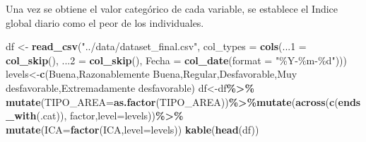 \documentclass[notspecified,article,submit,moreauthors,pdftex]{Definitions/mdpi}
\newenvironment{Shaded}{\begin{snugshade}}{\end{snugshade}}
\newcommand{\AttributeTok}[1]{\textcolor[rgb]{0.13,0.29,0.53}{#1}}
\newcommand{\FunctionTok}[1]{\textcolor[rgb]{0.13,0.29,0.53}{\textbf{#1}}}
\newcommand{\NormalTok}[1]{#1}
\newcommand{\OtherTok}[1]{\textcolor[rgb]{0.56,0.35,0.01}{#1}}
\newcommand{\SpecialCharTok}[1]{\textcolor[rgb]{0.81,0.36,0.00}{\textbf{#1}}}
\newcommand{\StringTok}[1]{\textcolor[rgb]{0.31,0.60,0.02}{#1}}
\begin{document}
Una vez se obtiene el valor categórico de cada variable, se establece el
Indice global diario como el peor de los individuales.

\begin{Shaded}
\begin{Highlighting}[]
\NormalTok{df }\OtherTok{\textless{}{-}} \FunctionTok{read\_csv}\NormalTok{(}\StringTok{"../data/dataset\_final.csv"}\NormalTok{, }
    \AttributeTok{col\_types =} \FunctionTok{cols}\NormalTok{(}\AttributeTok{...1 =} \FunctionTok{col\_skip}\NormalTok{(), }\AttributeTok{...2 =} \FunctionTok{col\_skip}\NormalTok{(), }
        \AttributeTok{Fecha =} \FunctionTok{col\_date}\NormalTok{(}\AttributeTok{format =} \StringTok{"\%Y{-}\%m{-}\%d"}\NormalTok{)))}
\NormalTok{levels}\OtherTok{\textless{}{-}}\FunctionTok{c}\NormalTok{(}\StringTok{\textquotesingle{}Buena\textquotesingle{}}\NormalTok{,}\StringTok{\textquotesingle{}Razonablemente Buena\textquotesingle{}}\NormalTok{,}\StringTok{\textquotesingle{}Regular\textquotesingle{}}\NormalTok{,}\StringTok{\textquotesingle{}Desfavorable\textquotesingle{}}\NormalTok{,}\StringTok{\textquotesingle{}Muy desfavorable\textquotesingle{}}\NormalTok{,}\StringTok{\textquotesingle{}Extremadamente desfavorable\textquotesingle{}}\NormalTok{)}
\NormalTok{df}\OtherTok{\textless{}{-}}\NormalTok{df}\SpecialCharTok{\%\textgreater{}\%} \FunctionTok{mutate}\NormalTok{(}\AttributeTok{TIPO\_AREA=}\FunctionTok{as.factor}\NormalTok{(TIPO\_AREA))}\SpecialCharTok{\%\textgreater{}\%}\FunctionTok{mutate}\NormalTok{(}\FunctionTok{across}\NormalTok{(}\FunctionTok{c}\NormalTok{(}\FunctionTok{ends\_with}\NormalTok{(}\StringTok{\textquotesingle{}.cat\textquotesingle{}}\NormalTok{)), factor,}\AttributeTok{level=}\NormalTok{levels))}\SpecialCharTok{\%\textgreater{}\%} \FunctionTok{mutate}\NormalTok{(}\AttributeTok{ICA=}\FunctionTok{factor}\NormalTok{(ICA,}\AttributeTok{level=}\NormalTok{levels))}
\FunctionTok{kable}\NormalTok{(}\FunctionTok{head}\NormalTok{(df))}
\end{Highlighting}
\end{Shaded}
\end{document}
